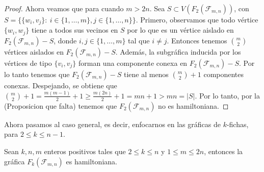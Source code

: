 \begin{proof}
    Ahora veamos que para cuando $m>2n$. Sea $S \subset V(F_2(\mathcal{F}_{m,n}))$, con
    $S=\{\{w_i,v_j\} \colon\ i \in \{1,\dots,m\},j\in\{1,\dots,n\}\}$. Primero,
    observamos que todo v\'ertice $\{w_i,w_j\}$ tiene a todos sus vecinos en $S$
    por lo que es un v\'ertice aislado en $F_2(\mathcal{F}_{m,n})-S$, donde $i,j \in
    \{1,\dots,m\}$ tal que $i \neq j$. Entonces tenemos $\binom{m}{2}$
    v\'ertices aislados en $F_2(\mathcal{F}_{m,n})-S$. Adem\'as, la subgr\'afica inducida
    por los v\'ertices de tipo $\{v_i,v_j\}$ forman una componente conexa en
    $F_2(\mathcal{F}_{m,n})-S$. Por lo tanto tenemos que $F_2(\mathcal{F}_{m,n})-S$ tiene al menos
    $\binom{m}{2} + 1$ componentes conexas. Despejando, se obtiene que
    $\binom{m}{2} + 1 = \frac{m(m-1)}{2} + 1 \geq \frac{m(2n)}{2} + 1 = mn + 1 >
    mn = |S|$. Por lo tanto, por la (Proposicion que falta) tenemos que
    $F_2(\mathcal{F}_{m,n})$ no es hamiltoniana.

\end{proof}

Ahora pasamos al caso general, es decir, enfocarnos en las gr\'aficas de
$k$-fichas, para $2 \leq k \leq n-1$.

\begin{teorema}
\label{teo:TokGenerFan}
    Sean $k, n, m$ enteros positivos tales que $2 \leq k \leq n$ y $1 \leq m
       \leq 2n$, entonces la gr\'afica $F_k(\mathcal{F}_{m,n})$ es hamiltoniana.
\end{teorema}

